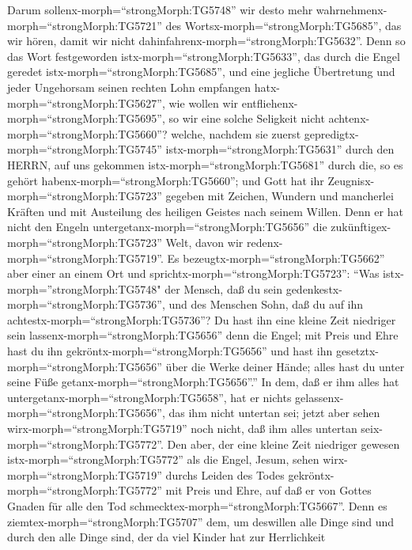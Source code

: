  Darum sollenx-morph=``strongMorph:TG5748'' wir desto mehr
wahrnehmenx-morph=``strongMorph:TG5721'' des
Wortsx-morph=``strongMorph:TG5685'', das wir hören, damit wir nicht
dahinfahrenx-morph=``strongMorph:TG5632''.  Denn so das Wort
festgeworden istx-morph=``strongMorph:TG5633'', das durch die Engel
geredet istx-morph=``strongMorph:TG5685'', und eine jegliche Übertretung
und jeder Ungehorsam seinen rechten Lohn empfangen
hatx-morph=``strongMorph:TG5627'',  wie wollen wir
entfliehenx-morph=``strongMorph:TG5695'', so wir eine solche Seligkeit
nicht achtenx-morph=``strongMorph:TG5660''? welche, nachdem sie zuerst
gepredigtx-morph=``strongMorph:TG5745''
istx-morph=``strongMorph:TG5631'' durch den HERRN, auf uns gekommen
istx-morph=``strongMorph:TG5681'' durch die, so es gehört
habenx-morph=``strongMorph:TG5660'';  und Gott hat ihr
Zeugnisx-morph=``strongMorph:TG5723'' gegeben mit Zeichen, Wundern und
mancherlei Kräften und mit Austeilung des heiligen Geistes nach seinem
Willen.  Denn er hat nicht den Engeln
untergetanx-morph=``strongMorph:TG5656'' die
zukünftigex-morph=``strongMorph:TG5723'' Welt, davon wir
redenx-morph=``strongMorph:TG5719''.  Es
bezeugtx-morph=``strongMorph:TG5662'' aber einer an einem Ort und
sprichtx-morph=``strongMorph:TG5723'': ``Was
istx-morph=''strongMorph:TG5748" der Mensch, daß du sein
gedenkestx-morph=``strongMorph:TG5736'', und des Menschen Sohn, daß du
auf ihn achtestx-morph=``strongMorph:TG5736''?  Du hast ihn
eine kleine Zeit niedriger sein lassenx-morph=``strongMorph:TG5656''
denn die Engel; mit Preis und Ehre hast du ihn
gekröntx-morph=``strongMorph:TG5656'' und hast ihn
gesetztx-morph=``strongMorph:TG5656'' über die Werke deiner Hände;
 alles hast du unter seine Füße
getanx-morph=``strongMorph:TG5656''.'' In dem, daß er ihm alles hat
untergetanx-morph=``strongMorph:TG5658'', hat er nichts
gelassenx-morph=``strongMorph:TG5656'', das ihm nicht untertan sei;
jetzt aber sehen wirx-morph=``strongMorph:TG5719'' noch nicht, daß ihm
alles untertan seix-morph=``strongMorph:TG5772''.  Den aber,
der eine kleine Zeit niedriger gewesen istx-morph=``strongMorph:TG5772''
als die Engel, Jesum, sehen wirx-morph=``strongMorph:TG5719'' durchs
Leiden des Todes gekröntx-morph=``strongMorph:TG5772'' mit Preis und
Ehre, auf daß er von Gottes Gnaden für alle den Tod
schmecktex-morph=``strongMorph:TG5667''.  Denn es
ziemtex-morph=``strongMorph:TG5707'' dem, um deswillen alle Dinge sind
und durch den alle Dinge sind, der da viel Kinder hat zur Herrlichkeit
